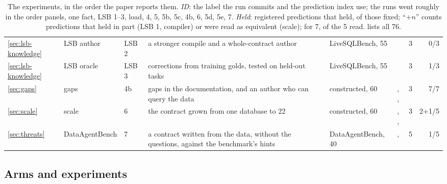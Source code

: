 \begin{table}[t]
\begin{tabular}{@{}lllL{5.5cm}lL{3.0cm}cr@{}}
\ref{sec:lsb-knowledge} & LSB author & LSB 2 & a stronger compile and a whole-contract author & LiveSQLBench, 55 & \mLuna{} & 3 & 0/3 \\
\ref{sec:lsb-knowledge} & LSB oracle & LSB 3 & corrections from training golds, tested on held-out tasks & LiveSQLBench, 55 & \mLuna{} & 3 & 1/3 \\
\ref{sec:gaps} & gaps & 4b & gaps in the documentation, and an author who can query the data & constructed, 60 & \mLuna{}, \mQwen{}, \mSol{} & 3 & 7/7 \\
\midrule
\ref{sec:scale} & scale & 6 & the contract grown from one database to 22 & constructed, 60 & \mLuna{}, \mSol{}, \mQwen{} & 3 & 2+1/5 \\
\ref{sec:threats} & DataAgentBench & 7 & a contract written from the data, without the questions, against the benchmark's hints & DataAgentBench, 40 & \mLuna{}, \mQwen{} & 5 & 1/5 \\
\bottomrule
\end{tabular}
\caption{The experiments, in the order the paper reports them. \emph{ID}:
the label the run commits and the prediction index use; the runs went
roughly in the order panels, one fact, LSB 1--3, load, 4, 5, 5b, 5c, 4b,
6, 5d, 5e, 7. \emph{Held}: registered predictions that held, of those fixed;
``+$n$'' counts predictions that held in part (LSB 1, compiler) or were
read as equivalent (scale); for 7, of the 5 read.  lists all 76.}
\label{tab:experiments}
\end{table}

\subsection{Arms and experiments}
\label{sec:arms}

